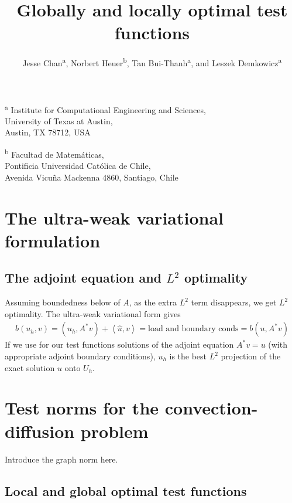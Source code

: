 \documentclass[11pt,onecolumn]{scrartcl}
\author{Jesse Chan\textsuperscript{a}, Norbert Heuer\textsuperscript{b}, Tan Bui-Thanh\textsuperscript{a}, and Leszek Demkowicz\textsuperscript{a}}
\title{Globally and locally optimal test functions}
\date{}
\newcommand{\LRp}[1]{\left( #1 \right)}
\newcommand{\LRa}[1]{\left\langle #1 \right\rangle}
\begin{document}
\maketitle
\begin{center}
\textsuperscript{a} Institute for Computational Engineering and Sciences, \\University of Texas at Austin, \\Austin, TX 78712, USA\\
\end{center}

\begin{center}
\textsuperscript{b} Facultad de Matem\'aticas, \\Pontificia Universidad Cat\'olica de Chile,\\
Avenida Vicu\~na Mackenna 4860, Santiago, Chile
\end{center}

\section{The ultra-weak variational formulation}

\subsection{The adjoint equation and $L^2$ optimality}

Assuming boundedness below of $A$, as the extra $L^2$ term disappears, we get $L^2$ optimality. The ultra-weak variational form gives
\begin{align*}
b(u_h,v) = \LRp{u_h,A^*v} + \LRa{\widehat{u},v} = \text{load and boundary conds} = b(u,A^*v)
\end{align*}
If we use for our test functions solutions of the adjoint equation $A^*v = u$ (with appropriate adjoint boundary conditions), $u_h$ is the best $L^2$ projection of the exact solution $u$ onto $U_h$. 

\section{Test norms for the convection-diffusion problem}

Introduce the graph norm here. 

\subsection{Local and global optimal test functions}
\end{document}
